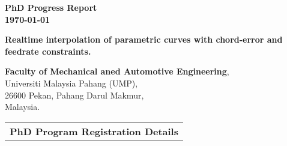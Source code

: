 \begin{titlepage}
\begin{center}



\vspace{4.0cm}

{\LARGE\bfseries 
   	PhD Progress Report \\
   \textbf{\today} \\
} 
\vspace{2.0cm}
\begin{tcolorbox}
{\Large 
	
	\begin{center}
   	\textbf{Realtime interpolation of parametric curves with chord-error and feedrate constraints.}
   	\end{center}	
  
}
\end{tcolorbox}

\vspace{2.0cm}
{\Large 
   	\textbf{Faculty of Mechanical aned Automotive Engineering},\\
   	Universiti Malaysia Pahang (UMP), \\
   	26600 Pekan, Pahang Darul Makmur,\\
   	Malaysia.\\    	
}
\end{center}

\vspace{1.0cm}


\begin{table}[ht]
	\begin{center}
		\begin{tabular}{ |p{0.5cm}|p{5.4cm}|p{10.0cm}| }
			\hline \multicolumn{3}{|c|}{\textbf{PhD Program Registration Details}} \\ [1.0ex]
	

\end{tabular}
\end{center}
\end{table}
\end{titlepage}
